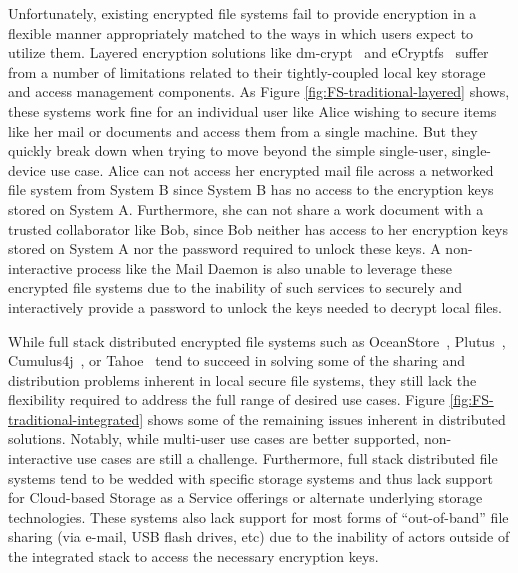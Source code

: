 Unfortunately, existing encrypted file systems fail to provide
encryption in a flexible manner appropriately matched to the ways in
which users expect to utilize them. Layered encryption solutions like
dm-crypt~\cite{dm-crypt} and eCryptfs~\cite{eCryptfs, Halcrow} suffer
from a number of limitations related to their tightly-coupled local
key storage and access management components. As Figure
\ref{fig:FS-traditional-layered} shows, these systems work fine for an
individual user like Alice wishing to secure items like her mail or
documents and access them from a single machine. But they quickly
break down when trying to move beyond the simple single-user,
single-device use case. Alice can not access her encrypted mail file
across a networked file system from System B since System B has no
access to the encryption keys stored on System A. Furthermore, she can
not share a work document with a trusted collaborator like Bob, since
Bob neither has access to her encryption keys stored on System A nor
the password required to unlock these keys. A non-interactive process
like the Mail Daemon is also unable to leverage these encrypted file
systems due to the inability of such services to securely and
interactively provide a password to unlock the keys needed to decrypt
local files.

While full stack distributed encrypted file systems such as
OceanStore~\cite{Kubiatowicz2000}, Plutus~\cite{Kallahalla2003},
Cumulus4j~\cite{cumulus4j}, or Tahoe~\cite{Wilcox-O'Hearn2008} tend to
succeed in solving some of the sharing and distribution problems
inherent in local secure file systems, they still lack the flexibility
required to address the full range of desired use cases. Figure
\ref{fig:FS-traditional-integrated} shows some of the remaining issues
inherent in distributed solutions. Notably, while multi-user use cases
are better supported, non-interactive use cases are still a
challenge. Furthermore, full stack distributed file systems tend to be
wedded with specific storage systems and thus lack support for
Cloud-based Storage as a Service offerings or alternate underlying
storage technologies. These systems also lack support for most forms
of ``out-of-band'' file sharing (via e-mail, USB flash drives, etc)
due to the inability of actors outside of the integrated stack to
access the necessary encryption keys.

